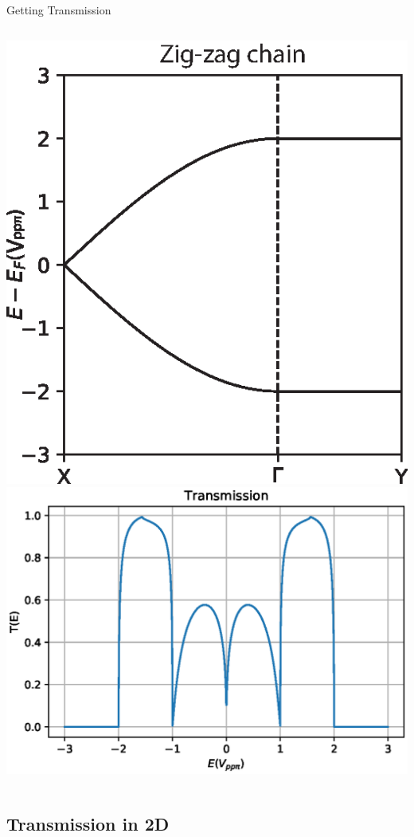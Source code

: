 \documentclass[hyperref={colorlinks=true,urlcolor=blue,linkcolor=.},aspectratio=1610,mathserif]{beamer}
\begin{document}
\begin{frame}{Getting Transmission}
\begin{overprint}
\begin{columns}[c]
		\end{columns}
		\vspace{-1cm}
		\begin{columns}[c]
			\includegraphics[width=.75\textwidth]{Figures/Beta2.eps}
			\includegraphics[width=.8\textwidth]{Figures/BetaTE.eps}
		\end{columns}
	\end{overprint}
\end{frame}

\subsection{Transmission in 2D}
\end{document}
